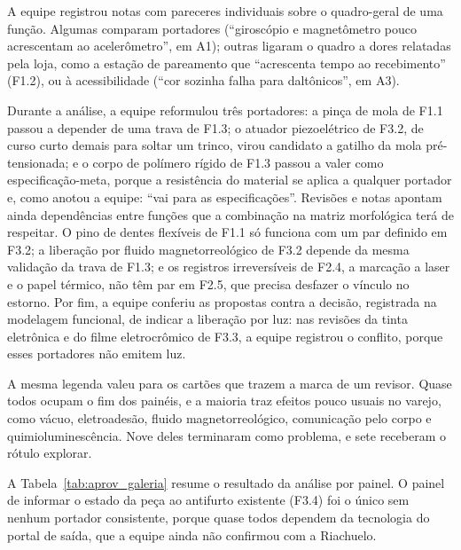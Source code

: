 A equipe registrou notas com pareceres individuais sobre o quadro-geral de uma função. Algumas comparam portadores (``giroscópio e magnetômetro pouco acrescentam ao acelerômetro'', em A1); outras ligaram o quadro a dores relatadas pela loja, como a estação de pareamento que ``acrescenta tempo ao recebimento'' (F1.2), ou à acessibilidade (``cor sozinha falha para daltônicos'', em A3).

Durante a análise, a equipe reformulou três portadores: a pinça de mola de F1.1 passou a depender de uma trava de F1.3; o atuador piezoelétrico de F3.2, de curso curto demais para soltar um trinco, virou candidato a gatilho da mola pré-tensionada; e o corpo de polímero rígido de F1.3 passou a valer como especificação-meta, porque a resistência do material se aplica a qualquer portador e, como anotou a equipe: ``vai para as especificações''. Revisões e notas apontam ainda dependências entre funções que a combinação na matriz morfológica terá de respeitar. O pino de dentes flexíveis de F1.1 só funciona com um par definido em F3.2; a liberação por fluido magnetorreológico de F3.2 depende da mesma validação da trava de F1.3; e os registros irreversíveis de F2.4, a marcação a laser e o papel térmico, não têm par em F2.5, que precisa desfazer o vínculo no estorno. Por fim, a equipe conferiu as propostas contra a decisão, registrada na modelagem funcional, de indicar a liberação por luz: nas revisões da tinta eletrônica e do filme eletrocrômico de F3.3, a equipe registrou o conflito, porque esses portadores não emitem luz.

A mesma legenda valeu para os cartões que trazem a marca de um revisor. Quase todos ocupam o fim dos painéis, e a maioria traz efeitos pouco usuais no varejo, como vácuo, eletroadesão, fluido magnetorreológico, comunicação pelo corpo e quimioluminescência. Nove deles terminaram como problema, e sete receberam o rótulo explorar.

A Tabela~\ref{tab:aprov_galeria} resume o resultado da análise por painel. O painel de informar o estado da peça ao antifurto existente (F3.4) foi o único sem nenhum portador consistente, porque quase todos dependem da tecnologia do portal de saída, que a equipe ainda não confirmou com a Riachuelo.

